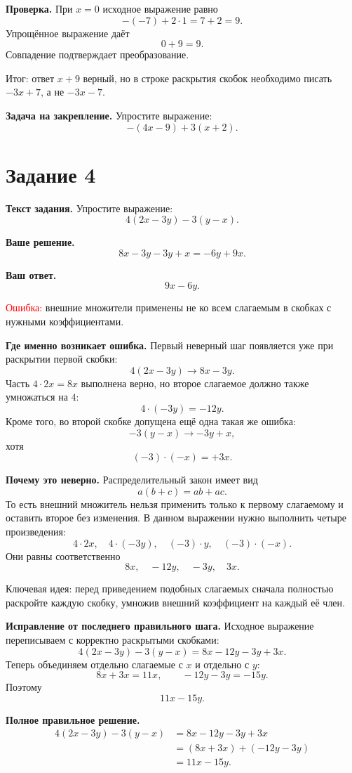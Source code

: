 \documentclass[12pt,a4paper]{article}
\begin{document}
\textbf{Проверка.}
При $x=0$ исходное выражение равно
\[
-(-7)+2\cdot 1=7+2=9.
\]
Упрощённое выражение даёт
\[
0+9=9.
\]
Совпадение подтверждает преобразование.

\textcolor{teal!60!black}{Итог:} ответ $x+9$ верный, но в строке раскрытия скобок необходимо писать $-3x+7$, а не $-3x-7$.

\textbf{Задача на закрепление.}
Упростите выражение:
\[
-(4x-9)+3(x+2).
\]

\newpage
{}\label{task:4}
\section*{Задание 4}

\textbf{Текст задания.}
Упростите выражение:
\[
4(2x-3y)-3(y-x).
\]

\textbf{Ваше решение.}
\[
8x-3y-3y+x=-6y+9x.
\]

\textbf{Ваш ответ.}
\[
9x-6y.
\]

\textcolor{red}{Ошибка:} внешние множители применены не ко всем слагаемым в скобках с нужными коэффициентами.

\textbf{Где именно возникает ошибка.}
Первый неверный шаг появляется уже при раскрытии первой скобки:
\[
4(2x-3y)\rightarrow 8x-3y.
\]
Часть $4\cdot 2x=8x$ выполнена верно, но второе слагаемое должно также умножаться на $4$:
\[
4\cdot(-3y)=-12y.
\]
Кроме того, во второй скобке допущена ещё одна такая же ошибка:
\[
-3(y-x)\rightarrow -3y+x,
\]
хотя
\[
(-3)\cdot(-x)=+3x.
\]

\textbf{Почему это неверно.}
Распределительный закон имеет вид
\[
a(b+c)=ab+ac.
\]
То есть внешний множитель нельзя применить только к первому слагаемому и оставить второе без изменения. В данном выражении нужно выполнить четыре произведения:
\[
4\cdot 2x,
\quad
4\cdot(-3y),
\quad
(-3)\cdot y,
\quad
(-3)\cdot(-x).
\]
Они равны соответственно
\[
8x,
\quad
-12y,
\quad
-3y,
\quad
3x.
\]

\textcolor{blue!60!black}{Ключевая идея:} перед приведением подобных слагаемых сначала полностью раскройте каждую скобку, умножив внешний коэффициент на каждый её член.

\textbf{Исправление от последнего правильного шага.}
Исходное выражение переписываем с корректно раскрытыми скобками:
\[
4(2x-3y)-3(y-x)=8x-12y-3y+3x.
\]
Теперь объединяем отдельно слагаемые с $x$ и отдельно с $y$:
\[
8x+3x=11x,
\qquad
-12y-3y=-15y.
\]
Поэтому
\[
11x-15y.
\]

\textbf{Полное правильное решение.}
\[
\begin{aligned}
4(2x-3y)-3(y-x)
&=8x-12y-3y+3x\\
&=(8x+3x)+(-12y-3y)\\
&=11x-15y.
\end{aligned}
\]
\end{document}
